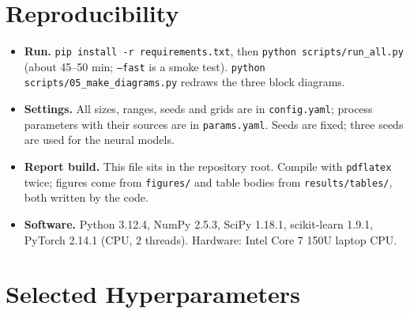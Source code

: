 \documentclass[11pt,a4paper]{article}
\newcommand{\tab}[1]{}
\begin{document}
\section{Reproducibility}
\begin{itemize}
  \item \textbf{Run.} \texttt{pip install -r requirements.txt}, then \texttt{python scripts/run\_all.py} (about 45--50 min; \texttt{--fast} is a smoke test). \texttt{python scripts/05\_make\_diagrams.py} redraws the three block diagrams.
  \item \textbf{Settings.} All sizes, ranges, seeds and grids are in \texttt{config.yaml}; process parameters with their sources are in \texttt{params.yaml}. Seeds are fixed; three seeds are used for the neural models.
  \item \textbf{Report build.} This file sits in the repository root. Compile with \texttt{pdflatex} twice; figures come from \texttt{figures/} and table bodies from \texttt{results/tables/}, both written by the code.
  \item \textbf{Software.} Python 3.12.4, NumPy 2.5.3, SciPy 1.18.1, scikit-learn 1.9.1, PyTorch 2.14.1 (CPU, 2 threads). Hardware: Intel Core 7 150U laptop CPU.
\end{itemize}

\section{Selected Hyperparameters}
\begin{table}[H]
\centering\footnotesize
\caption{Hyperparameters selected on the validation set (dynamic networks by 100-step validation rollout RMSE).}\label{tab:hyper}
\tab{hyperparams}
\end{table}
\end{document}
